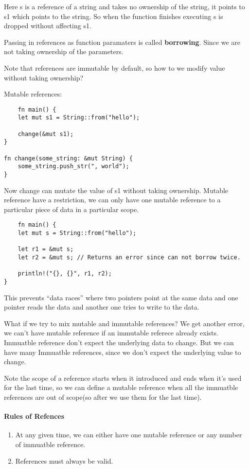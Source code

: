 Here s is a reference of a string and takes no ownership of the string, it points to s1 which points to the string.
So when the function finishes executing s is dropped without affecting s1.

\begin{definition}
    Passing in references as function paramaters is called \textbf{borrowing}. Since we are not taking ownership of the parameters.
\end{definition} 
Note that references are immutable by default, so how to we modify value without taking ownership?

Mutable references:

\begin{lstlisting}
    fn main() {
    let mut s1 = String::from("hello");

    change(&mut s1);
}

fn change(some_string: &mut String) {
    some_string.push_str(", world");
}
\end{lstlisting}

Now change can mutate the value of s1 without taking ownership. Mutable reference have a restriction, we can only have one mutable reference to a particular piece of data 
in a particular scope.

\newpage

\begin{lstlisting}
    fn main() {
    let mut s = String::from("hello");

    let r1 = &mut s;
    let r2 = &mut s; // Returns an error since can not borrow twice.

    println!("{}, {}", r1, r2);
}
\end{lstlisting}

This prevents ``data races'' where two pointers point at the same data and one pointer reads the data and another one tries to write to the data.


What if we try to mix mutable and immutable references? We get another error, we can't have mutable reference if an immutable referece already exists. Immuatble reference don't expect the underlying data to change.
But we can have many Immuatble references, since we don't expect the underlying value to change.

Note the scope of a reference starts when it introduced and ends when it's used for the last time, so we can define a mutable reference when all the immuatble references are out of scope(so after we use them for the last time).

\paragraph*{Rules of Refences}\begin{enumerate}
    \item At any given time, we can either have one mutable reference or any number of immuatble reference.
    \item References must always be valid.
\end{enumerate}

